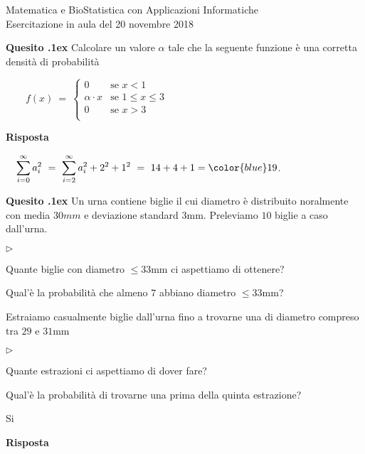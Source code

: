 \documentclass[11pt,twoside,a4paper]{article}
\newcommand{\mylabel}[1]{#1\hfill}
\renewenvironment{itemize}
  {\begin{list}{$\triangleright$}{%
   \setlength{\parskip}{0mm}
   \setlength{\topsep}{.4\baselineskip}
   \setlength{\rightmargin}{0mm}
   \setlength{\listparindent}{0mm}
   \setlength{\itemindent}{0mm}
   \setlength{\labelwidth}{2ex}
   \setlength{\itemsep}{.4\baselineskip}
   \setlength{\parsep}{0mm}
   \setlength{\partopsep}{0mm}
   \setlength{\labelsep}{1ex}
   \setlength{\leftmargin}{\labelwidth+\labelsep}
   \let\makelabel\mylabel}}{%
   \end{list}\vspace*{-1.3mm}}
\newcounter{quesito}
\newenvironment{question}{\addtocounter{quesito}{1}\par\textbf{Quesito \thequesito.\kern1ex}}{\vspace{0.5\parskip}}
\newenvironment{answer}{\par\textbf{Risposta\quad}}{\vspace{\parskip}}
\begin{document}
\colorbox{blue!10}{\begin{minipage}{\textwidth}
Matematica e BioStatistica con Applicazioni Informatiche\\
Esercitazione in aula del 20 novembre 2018
\end{minipage}}




\begin{question}
Calcolare un valore $\alpha$ tale che la seguente funzione è una corretta densità di probabilità

$\displaystyle\qquad f(x)\ =\ \left\{
\begin{array}{ll}
0& \textrm{se }x<1\\
\alpha\cdot x& \textrm{se } 1\le x\le 3\\
0& \textrm{se }x>3\\
\end{array}\right.$
\begin{answer}

$\quad\displaystyle\sum^{\infty}_{i=0}a^2_i
\ =\ \sum^{\infty}_{i=2}a^2_i+2^2+1^2
\ =\ 14+4+1={\color{blue}19}$.
\end{answer}
\end{question}



\begin{question}
Un urna contiene biglie il cui diametro è distribuito noralmente con media $30mm$ e deviazione standard $3$mm. Preleviamo $10$ biglie a caso dall'urna. 

\begin{itemize}
\item[1.] Quante biglie con diametro $\le 33$mm ci aspettiamo di ottenere? 
\item[2.] Qual'è la probabilità che almeno $7$ abbiano diametro $\le 33$mm?
\end{itemize}

Estraiamo casualmente biglie dall'urna fino a trovarne una di diametro compreso tra $29$ e $31$mm

\begin{itemize}
\item[1.] Quante estrazioni ci aspettiamo di dover fare? 
\item[2.] Qual'è la probabilità di trovarne una prima della quinta estrazione?
\end{itemize}


Si 
\begin{answer}
\end{answer}
\end{question}
\end{document}
